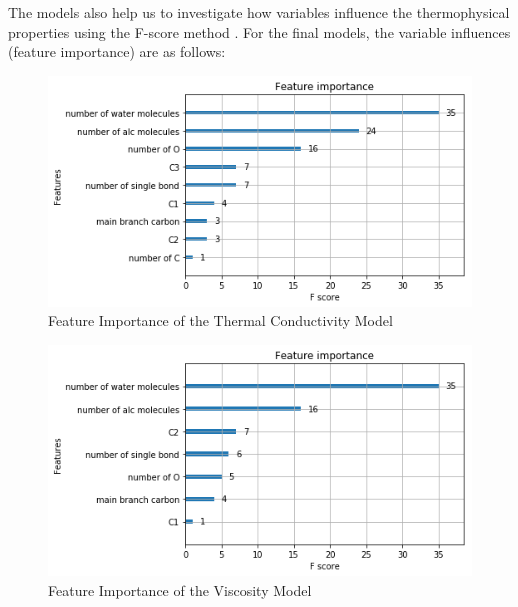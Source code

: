 The models also help us to investigate how variables influence the 
thermophysical properties using the F-score method \cite{sasaki_truth_2007}. 
For the final models, the variable influences (feature importance) 
are as follows:

\begin{figure}[ht]
    \includegraphics[width=1\textwidth]{fitc.png}
    \centering
    \captionsetup{justification=centering}
    \caption{Feature Importance of the Thermal Conductivity Model}
\end{figure}
\begin{figure}[ht]
    \includegraphics[width=1\textwidth]{fiv.png}
    \centering
    \captionsetup{justification=centering}
    \caption{Feature Importance of the Viscosity Model}
\end{figure}
\newpage

